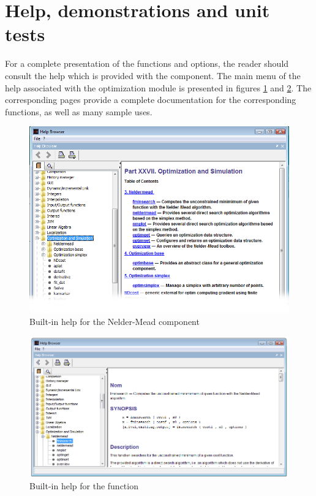 \section{Help, demonstrations and unit tests}

For a complete presentation of the functions and options, the reader 
should consult the help which is provided with the component.
The main menu of the help associated with the optimization 
module is presented in figures \ref{fig-intro-help} and \ref{fig-intro-helpfminsearch}.
The corresponding pages provide a complete documentation for the 
corresponding functions, as well as many sample uses.

\begin{figure}
\begin{center}
\includegraphics[width=15cm]{introduction-help.png}
\end{center}
\caption{Built-in help for the Nelder-Mead component}
\label{fig-intro-help}
\end{figure}

\begin{figure}
\begin{center}
\includegraphics[width=15cm]{introduction-help-fminsearch.png}
\end{center}
\caption{Built-in help for the  function}
\label{fig-intro-helpfminsearch}
\end{figure}

